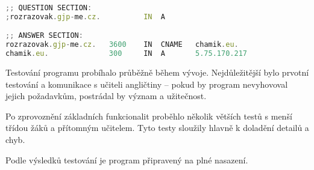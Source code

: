 \begin{lstlisting}[language=JavaScript,caption={Úryvek výpisu programu dig}]
;; QUESTION SECTION:
;rozrazovak.gjp-me.cz.		    IN	A

;; ANSWER SECTION:
rozrazovak.gjp-me.cz.	3600    IN	CNAME	chamik.eu.
chamik.eu.		        300	    IN	A	    5.75.170.217
\end{lstlisting}

Testování programu probíhalo průběžně během vývoje. Nejdůležitější bylo prvotní testování a komunikace s učiteli angličtiny -- pokud by program nevyhovoval jejich požadavkům, postrádal by význam a užitečnost.

Po zprovoznění základních funkcionalit proběhlo několik větších testů s menší třídou žáků a přítomným učitelem. Tyto testy sloužily hlavně k doladění detailů a chyb.

Podle výsledků testování je program připravený na plné nasazení.

